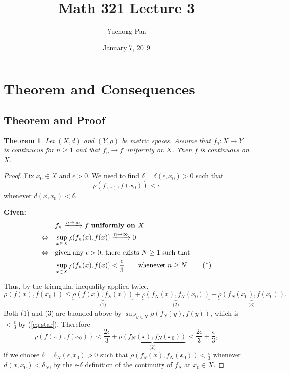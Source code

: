 \documentclass[letterpaper, reqno,11pt]{article}
\begin{document}
\title{Math 321 Lecture 3}
\author{Yuchong Pan}
\date{January 7, 2019}
\newtheorem{thm}{Theorem}
\newtheorem{defn}{Definition}
\newtheorem{exs}{Exercise}
\newtheorem{remark}{Remark}
\newtheorem{claim}{Claim}
\maketitle
%

\section{Theorem and Consequences}

\subsection{Theorem and Proof}

\begin{thm} \label{thm:1}
  \normalfont Let $(X, d)$ and $(Y, \rho)$ be metric spaces. Assume that $f_n : X \to Y$ is continuous for $n \geq 1$ and that $f_n \to f$ uniformly on $X$. Then $f$ is continuous on $X$.
\end{thm}

\begin{proof}
  Fix $x_0 \in X$ and $\epsilon > 0$. We need to find $\delta = \delta(\epsilon, x_0) > 0$ such that
  $$ \rho(f_(x), f(x_0)) < \epsilon $$
  whenever $d(x, x_0) < \delta$.

  {\bf Given:}
  \begin{align*}
    & \quad f_n \xrightarrow{n \to \infty} f \text{\bf ~uniformly on $X$} \\
    \Leftrightarrow & \quad \sup_{x \in X} \rho(f_n(x), f(x)) \xrightarrow{n \to \infty} 0 \\
    \Leftrightarrow & \quad \text{given any $\epsilon > 0$, there exists $N \geq 1$ such that} \\
    & \quad \sup_{x \in X} \rho(f_n(x), f(x)) < \frac{\epsilon}{3} \qquad \text{whenever $n \geq N$}. \tag{*} \label{eq:star}
  \end{align*}

  Thus, by the triangular inequality applied twice,
  $$ \rho(f(x), f(x_0)) \leq \underbrace{\rho(f(x), f_N(x))}_\text{(1)} + \underbrace{\rho(f_N(x), f_N(x_0))}_\text{(2)} + \underbrace{\rho(f_N(x_0), f(x_0))}_\text{(3)}. $$
  Both (1) and (3) are buonded above by $\sup_{y \in X} \rho(f_N(y), f(y))$, which is $< \frac{\epsilon}{3}$ by (\ref{eq:star}).
  Therefore,
  $$ \rho(f(x), f(x_0)) < \frac{2\epsilon}{3} + \underbrace{\rho(f_N(x), f_N(x_0))}_\text{(2)} < \frac{2\epsilon}{3} + \frac{\epsilon}{3}, $$
  if we choose $\delta = \delta_N(\epsilon, x_0) > 0$ such that $\rho(f_N(x), f_N(x_0)) < \frac{\epsilon}{3}$ whenever $d(x, x_0) < \delta_N$, by the $\epsilon$-$\delta$ definition of the continuity of $f_N$ at $x_0 \in X$.
\end{proof}
\end{document}
